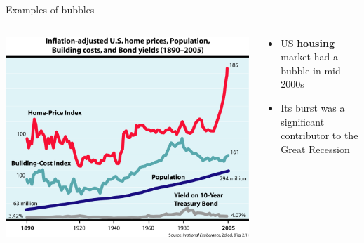 \documentclass[english,10pt
,aspectratio=169
]{beamer}
\begin{document}


\begin{frame}[handout:0]{Examples of bubbles}
	\begin{columns}
		\begin{column}{0.55\linewidth}
			\center
			\includegraphics[width=0.95\linewidth]{pics/housing}
		\end{column}
		\begin{column}{0.45\linewidth}
			\begin{itemize}
				\item US \textbf{housing} market had a bubble in mid-2000s
				\item Its burst was a significant contributor to the Great Recession
			\end{itemize}
		\end{column}
	\end{columns}
\end{frame}
\end{document}
